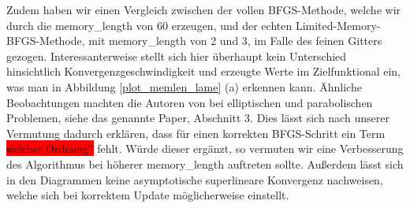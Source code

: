 Zudem haben wir einen Vergleich zwischen der vollen BFGS-Methode, welche wir durch die \textsf{memory\_length} von 60 erzeugen, und der echten Limited-Memory-BFGS-Methode, mit \textsf{memory\_length} von 2 und 3, im Falle des feinen Gitters gezogen. Interessanterweise stellt sich hier überhaupt kein Unterschied hinsichtlich Konvergenzgeschwindigkeit und erzeugte Werte im Zielfunktional ein, was man in Abbildung \ref{plot_memlen_lame} (a) erkennen kann. Ähnliche Beobachtungen machten die Autoren von \cite{diffusion} bei elliptischen und parabolischen Problemen, siehe das genannte Paper, Abschnitt 3. Dies lässt sich nach unserer Vermutung dadurch erklären, dass für einen korrekten BFGS-Schritt ein Term \colorbox{red}{ welcher Ordnung?} fehlt. Würde dieser ergänzt, so vermuten wir eine Verbesserung des Algorithmus bei höherer \textsf{memory\_length} auftreten sollte. Außerdem lässt sich in den Diagrammen keine asymptotische superlineare Konvergenz nachweisen, welche sich bei korrektem Update möglicherweise einstellt.

